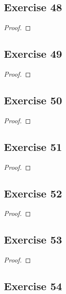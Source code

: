 \documentclass[14pt]{extarticle}
\begin{document}
\subsection{Exercise 48}

\begin{proof}

\end{proof}

\subsection{Exercise 49}

\begin{proof}

\end{proof}

\subsection{Exercise 50}

\begin{proof}

\end{proof}

\subsection{Exercise 51}

\begin{proof}

\end{proof}

\subsection{Exercise 52}

\begin{proof}

\end{proof}

\subsection{Exercise 53}

\begin{proof}

\end{proof}

\subsection{Exercise 54}
\end{document}
